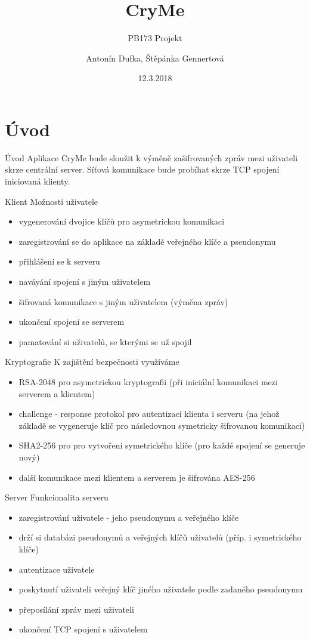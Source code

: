 \documentclass{beamer}
\title[Your Short Title]{CryMe}
\subtitle{PB173 Projekt}
\author{Antonín Dufka, Štěpánka Gennertová}
\date{12.3.2018}
\begin{document}
	
	\begin{frame}
	\titlepage
\end{frame}



\section{Úvod}
\begin{frame}{Úvod}
	Aplikace CryMe bude sloužit k výměně zašifrovaných zpráv mezi uživateli skrze centrální server. Síťová komunikace bude probíhat skrze TCP spojení iniciovaná klienty. 
\end{frame}

\begin{frame}{Klient}
Možnosti uživatele
\begin{itemize}
	\item vygenerování dvojice klíčů pro asymetrickou komunikaci
	\item zaregistrování se do aplikace na základě veřejného klíče a pseudonymu
	\item přihlášení se k serveru
	\item naváyání spojení s jiným uživatelem
	\item šifrovaná komunikace s jiným uživatelem (výměna zpráv)
	\item ukončení spojení se serverem
	\item pamatování si uživatelů, se kterými se už spojil
\end{itemize}
\end{frame}


\begin{frame}{Kryptografie}
K zajištění bezpečnosti využíváme
\begin{itemize}
	\item RSA-2048 pro asymetrickou kryptografii (při iniciální komunikaci mezi serverem a klientem)
	\item challenge - response protokol pro autentizaci klienta i serveru (na jehož základě se vygeneruje klíč pro následovnou symetricky šifrovanou komunikaci)
	\item SHA2-256 pro pro vytvoření symetrického klíče (pro každé spojení se generuje nový)
	\item další komunikace mezi klientem a serverem je šifrována AES-256
\end{itemize}
\end{frame}


\begin{frame}{Server}
Funkcionalita serveru
\begin{itemize}
	\item zaregistrování uživatele - jeho pseudonymu a veřejného klíče
	\item drží si databázi pseudonymů a veřejných klíčů uživatelů (příp. i symetrického klíče)
	\item autentizace uživatele
	\item poskytnutí uživateli veřejný klíč jiného uživatele podle zadaného pseudonymu
	\item přeposílání zpráv mezi uživateli
	\item ukončení TCP spojení s uživatelem
\end{itemize}
\end{frame}
\end{document}

